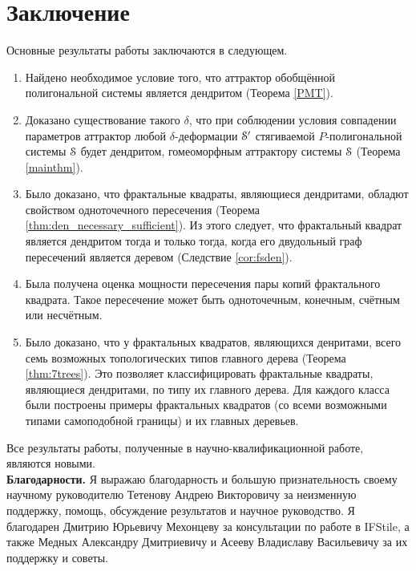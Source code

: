 \chapter*{Заключение}                       %


Основные результаты работы заключаются в следующем.

\begin{enumerate}
\item Найдено необходимое условие того, что аттрактор обобщённой полигональной системы является дендритом (Теорема \ref{PMT}). 

\item Доказано существование такого $\delta$, что при соблюдении условия совпадении параметров аттрактор любой $\delta$-деформации ${\EuScript S}'$ стягиваемой $P$-полигональной системы ${\EuScript S}$ будет дендритом, гомеоморфным аттрактору системы ${\EuScript S}$ (Теорема \ref{mainthm}).



\item Было доказано, что фрактальные квадраты, являющиеся дендритами, обладют свойством одноточечного пересечения (Теорема \ref{thm:den_necessary_sufficient}).
Из этого следует, что фрактальный квадрат является дендритом тогда и только тогда, когда его двудольный граф пересечений является деревом (Следствие \ref{cor:fsden}).

\item Была получена оценка мощности пересечения пары копий фрактального квадрата.
Такое пересечение может быть одноточечным, конечным, счётным или несчётным.

\item Было доказано, что у фрактальных квадратов, являющихся денритами, всего семь возможных топологических типов главного дерева (Теорема \ref{thm:7trees}).
Это позволяет классифицировать фрактальные квадраты, являющиеся дендритами, по типу их главного дерева.
Для каждого класса были построены примеры фрактальных квадратов (со всеми возможными типами самоподобной границы) и их главных деревьев.
\end{enumerate}

Все результаты работы, полученные в научно-квалификационной работе, являются новыми.
\\

\textbf{Благодарности.}
Я выражаю благодарность и большую признательность своему научному руководителю Тетенову Андрею Викторовичу за неизменную поддержку, помощь, обсуждение результатов и научное руководство.
Я благодарен Дмитрию Юрьевичу Мехонцеву за консультации по работе в IFStile, а также Медных Александру Дмитриевичу и Асееву Владиславу Васильевичу за их поддержку и советы.